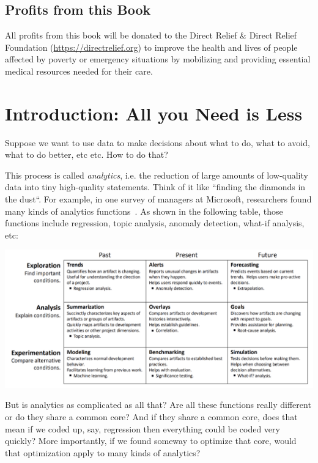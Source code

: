 \documentclass[landscape,	DIV=calc,%
							paper=letter,%
							fontsize=10pt,%
							twocolumn]{scrartcl}	 					%
\begin{document}
\subsection*{Profits from this Book}
All profits from this book will be donated to the 
Direct Relief
\& Direct Relief Foundation 
(\url{https://directrelief.org}) to improve the health and lives of
people affected by poverty or emergency situations by mobilizing
and providing essential medical resources needed for their care.


\clearpage
\tableofcontents
\clearpage


\clearpage \section{Introduction: All you Need is Less}

Suppose we want to use data to make decisions about what to do,
what to avoid, what to do better, etc etc. How to do that?

This process is called {\em analytics}, i.e. the reduction of large
amounts of low-quality data into tiny high-quality statements. Think of it like
``finding the diamonds in the dust``. 
For example,
in one survey of managers at   Microsoft, 
researchers found many kinds  of analytics functions~\cite{buse2012information}.
As shown in the following table, those  functions include regression, topic analysis, anomaly detection, what-if analysis,
etc:

\includegraphics[width=\linewidth]{Buse.png} 

But is analytics as complicated as all that? Are all these functions really
different or do they share a
common core? And if they share a common core,
does that mean if we coded up, say, regression then everything could be coded
very quickly? 
More importantly, if we found someway to optimize
that core, would that optimization apply to many kinds of analytics?
\end{document}
